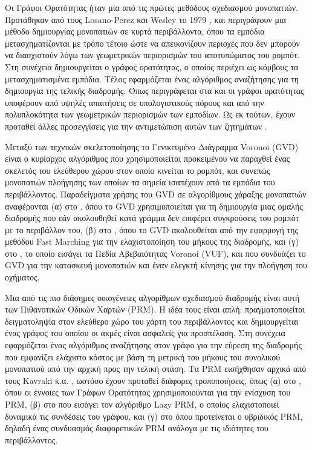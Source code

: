 Οι Γράφοι Ορατότητας ήταν μία από τις πρώτες μεθόδους σχεδιασμού μονοπατιών.
Προτάθηκαν από τους Losano-Perez και Wesley το 1979 \cite{Lozano-Perez1979},
και περιγράφουν μια μέθοδο δημιουργίας μονοπατιών σε κυρτά περιβάλλοντα, όπου
τα εμπόδια μετασχηματίζονται με τρόπο τέτοιο ώστε να απεικονίζουν περιοχές που
δεν μπορούν να διασχιστούν λόγω των γεωμετρικών περιορισμών του αποτυπώματος
του ρομπότ. Στη συνέχεια δημιουργείται ο γράφος ορατότητας, ο οποίος περιέχει
ως κόμβους τα μετασχηματισμένα εμπόδια. Τέλος εφαρμόζεται ένας αλγόριθμος
αναζήτησης για τη δημιουργία της τελικής διαδρομής. Όπως περιγράφεται στα
\cite{Ghosh2007} και \cite{Ghosh2013} οι γράφοι ορατότητας υποφέρουν από υψηλές
απαιτήσεις σε υπολογιστικούς πόρους και από την πολυπλοκότητα των γεωμετρικών
περιορισμών των εμποδίων. Ως εκ τούτων, έχουν προταθεί άλλες προσεγγίσεις για
την αντιμετώπιση αυτών των ζητημάτων \cite{Kim2011}.

Μεταξύ των τεχνικών σκελετοποίησης το Γενικευμένο Διάγραμμα Voronoi (GVD) είναι
ο κυρίαρχος αλγόριθμος που χρησιμοποιείται προκειμένου να παραχθεί ένας
σκελετός του ελεύθερου χώρου στον οποίο κινείται το ρομπότ, και συνεπώς
μονοπατιών πλοήγησης των οποίων τα σημεία ισαπέχουν από τα εμπόδια του
περιβάλλοντος. Παραδείγματα χρήσης του GVD σε αλγορίθμους χάραξης μονοπατιών
αναφέρονται (α) στο \cite{Bhattacharya2007}, όπου το GVD χρησιμοποιείται για τη
δημιουργία μιας ομαλής διαδρομής που εάν ακολουθηθεί κατά γράμμα δεν επιφέρει
συγκρούσεις του ρομπότ με το περιβάλλον του, (β) στο \cite{Garrido2006}, όπου
το GVD ακολουθείται από την εφαρμογή της μεθόδου Fast Marching για την
ελαχιστοποίηση του μήκους της διαδρομής, και (γ) στο \cite{Ok2013}, το οποίο
εισάγει τα Πεδία Αβεβαιότητας Voronoi (VUF), και που συνδυάζει το GVD για την
κατασκευή μονοπατιών και έναν ελεγκτή κίνησης για την πλοήγηση του οχήματος.

Μια από τις πιο διάσημες οικογένειες αλγορίθμων σχεδιασμού διαδρομής είναι αυτή
των Πιθανοτικών Οδικών Χαρτών (PRM). Η ιδέα τους είναι απλή: πραγματοποιείται
δειγματοληψία στον ελεύθερο χώρο του χάρτη του περιβάλλοντος και δημιουργείται
ένας γράφος του οποίου οι ακμές είναι ασφαλείς για προσπέλαση. Στη συνέχεια
εφαρμόζεται ένας αλγόριθμος αναζήτησης στον γράφο για την εύρεση της διαδρομής
που εμφανίζει ελάχιστο κόστος με βάση τη μετρική του μήκους του συνολικού
μονοπατιού από την αρχική προς την τελική στάση. Τα PRM εισήχθησαν αρχικά από
τους Kavraki κ.α. \cite{Kavraki1996}, ωστόσο έχουν προταθεί διάφορες
τροποποιήσεις, όπως (α) στο \cite{Nissoux}, όπου οι έννοιες των Γράφων
Ορατότητας χρησιμοποιούνται για την ενίσχυση του PRM, (β) στο \cite{Bohlin2000}
που εισάγει τον αλγόριθμο Lazy PRM, ο οποίος ελαχιστοποιεί δυναμικά τις
συνδέσεις του γράφου, και (γ) στο \cite{Hsua} όπου προτείνεται ο υβριδικός PRM,
δηλαδή ένας συνδυασμός διαφορετικών PRM ανάλογα με τις ιδιότητες του
περιβάλλοντος.

